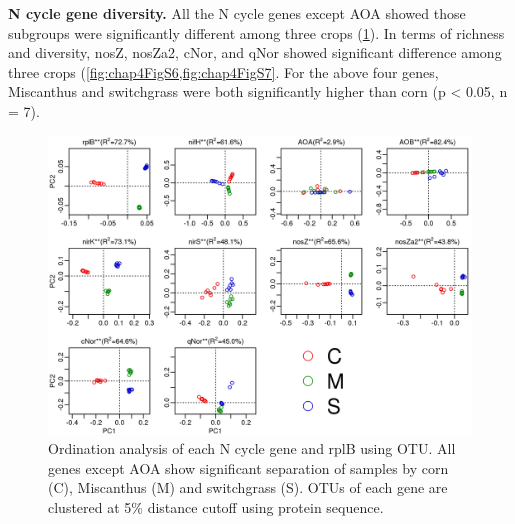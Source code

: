 \documentclass[]{msu-thesis}
\begin{document}
\textbf{N cycle gene diversity. }
All the N cycle genes except AOA showed those subgroups were significantly different among three crops (\cref{fig:chap4Fig3}). In terms of richness and diversity, nosZ, nosZa2, cNor, and qNor showed significant difference among three crops (\cref{fig:chap4FigS6,fig:chap4FigS7}. For the above four genes, Miscanthus and switchgrass were both significantly higher than corn (p < 0.05, n = 7).


\begin{figure}[tbph!]
  \centering
  \includegraphics[scale=1]{figs/chap4-xander-ncycle-otu-pca}
  \caption[Ordination analysis of each N cycle gene and rplB using OTU]{Ordination analysis of each N cycle gene and rplB using OTU. All genes except AOA show significant separation of samples by corn (C), Miscanthus (M) and switchgrass (S). OTUs of each gene are clustered at 5\% distance cutoff using protein sequence.}
  \label{fig:chap4Fig3}
\end{figure}
\end{document}
